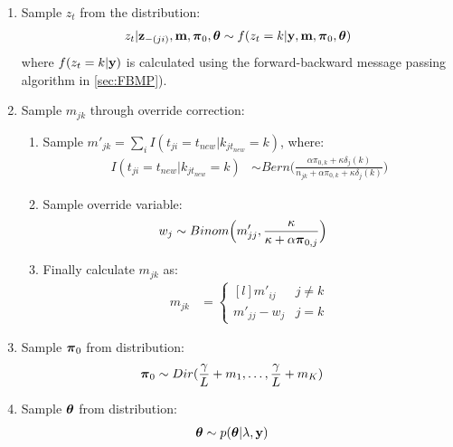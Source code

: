 \documentclass{article} %
\begin{document}
\begin{enumerate}
\item Sample $z_{t}$ from the distribution:
\begin{align*}
z_{t} | {\bf z}_{-(ji)}, {\bf m}, \boldsymbol{\pi}_0, \boldsymbol{\theta} \sim f(z_t=k | {\bf y}, {\bf m}, \boldsymbol{\pi}_0, \boldsymbol{\theta})
\end{align*}
where $f(z_t=k | {\bf y})$ is calculated using the forward-backward message passing algorithm in \ref{sec:FBMP}).

\item Sample $m_{jk}$ through override correction:
\begin{enumerate}
\item Sample $m'_{jk} = \sum_{i} I(t_{ji} = t_{new}|k_{jt_{new}} = k)$, where:
\begin{align*}
I(t_{ji} = t_{new}|k_{jt_{new}} = k) & \sim
Bern \Big(
\frac{\alpha \pi_{0, k} + \kappa \delta_j(k)}
{n_{jk} + \alpha \pi_{0, k} + \kappa \delta_j(k)} \Big)
\end{align*}
\item Sample override variable:
\begin{align*}
w_j & \sim
Binom \Big(m'_{jj}, \frac{\kappa}{\kappa + \alpha\boldsymbol{\pi}_{0, j}} \Big)
\end{align*}
\item Finally calculate $m_{jk}$ as:
\begin{align*}
m_{jk} &=
\left\{\begin{matrix*}[l]
m'_{ij} & j \neq k
\\
m'_{jj} - w_j & j=k
\end{matrix*}\right.
\end{align*}
\end{enumerate}

\item Sample $\boldsymbol{\pi}_0$ from distribution:
\begin{align*}
\boldsymbol{\pi}_0 & \sim Dir(\frac{\gamma}{L} + m_1, \dots, \frac{\gamma}{L} + m_K)
\end{align*}

\item Sample $\boldsymbol{\theta}$ from distribution:
\begin{align*}
\boldsymbol{\theta} &\sim p(\boldsymbol{\theta} | \lambda, {\bf y})
\end{align*}

\end{enumerate}
\end{document}
